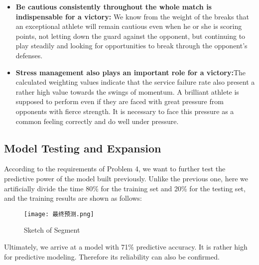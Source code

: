 \documentclass{mcmthesis}
\begin{document}
\begin{itemize}
        \item {\bf Be cautious consistently throughout the whole match is indispensable for a victory:}
        We
        know from the weight of the breaks that an exceptional athlete will remain cautious even when he
        or she is scoring points, not letting down the guard against the opponent, but continuing to play
        steadily and looking for opportunities to break through the opponent's defenses.\\
        \item {\bf Stress management also plays an important role for a victory:}The calculated weighting
        values indicate that the service failure rate also present a rather high value towards the swings of
        momentum. A brilliant athlete is supposed to perform even if they are faced with great pressure
        from opponents with fierce strength. It is necessary to face this pressure as a common feeling
        correctly and do well under pressure.
    \end{itemize}

    \subsection{Model Testing and Expansion}
According to the requirements of Problem 4, we want to further test the predictive power of
the model built previously. Unlike the previous one, here we artificially divide the time 80\% for
the training set and 20\% for the testing set, and the training results are shown as follows:

\begin{figure}[htbp]
    \centering
    \texttt{[image: 最终预测.png]}
    \caption{Sketch of Segment} \label{Figure 24}
\end{figure}

Ultimately, we arrive at a model with 71\% predictive accuracy. It is rather high for predictive
modeling. Therefore its reliability can also be confirmed.
\end{document}
